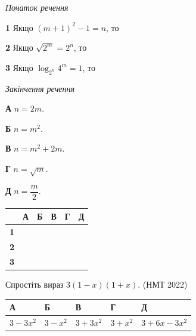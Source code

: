 \documentclass[14pt]{extarticle}
\newcommand{\answerTable}[5]{
\begin{center}
\begin{tabular}{|*{5}{>{\centering\arraybackslash}m{2.8cm}|}}
\hline
\rule[-0.3cm]{0pt}{0.8cm}\textbf{А} & \textbf{Б} & \textbf{В} & \textbf{Г} & \textbf{Д} \\
\hline
\rule[-0.4cm]{0pt}{1.0cm}#1 & \rule[-0.4cm]{0pt}{1.0cm}#2 & \rule[-0.4cm]{0pt}{1.0cm}#3 & \rule[-0.4cm]{0pt}{1.0cm}#4 & \rule[-0.4cm]{0pt}{1.0cm}#5 \\
\hline
\end{tabular}
\end{center}
}
\newcommand{\matchTable}{
\begin{tabular}{|>{\centering\arraybackslash}p{0.25cm}|*{5}{>{\centering\arraybackslash}p{0.25cm}|}}
\hline
& \scriptsize\textbf{А} & \scriptsize\textbf{Б} & \scriptsize\textbf{В} & \scriptsize\textbf{Г} & \scriptsize\textbf{Д} \\
\hline
\scriptsize\textbf{1} & \rule{0pt}{0.25cm} & & & & \\
\hline
\scriptsize\textbf{2} & \rule{0pt}{0.25cm} & & & & \\
\hline
\scriptsize\textbf{3} & \rule{0pt}{0.25cm} & & & & \\
\hline
\end{tabular}
}
\newcommand{\task}[2]{\noindent\makebox[1.5em][l]{\textbf{#1.}}\parbox[t]{\dimexpr\textwidth-1.5em}{#2}}
\newcommand{\nmtyear}[1]{\hfill{\small\color{yearcolor}(НМТ #1)}}
\begin{document}
\vspace{0.3cm}
\noindent
\begin{minipage}[t]{0.4\textwidth}
\vspace{0pt}
\textit{Початок речення}

\vspace{0.2cm}
\textbf{1} \quad Якщо $(m + 1)^2 - 1 = n$, то

\vspace{0.2cm}
\textbf{2} \quad Якщо $\sqrt{2^m} = 2^n$, то

\vspace{0.2cm}
\textbf{3} \quad Якщо $\log_{2^n} 4^m = 1$, то
\end{minipage}
\hfill
\begin{minipage}[t]{0.32\textwidth}
\vspace{0pt}
\textit{Закінчення речення}

\vspace{0.2cm}
\textbf{А} \quad $n = 2m$.

\vspace{0.2cm}
\textbf{Б} \quad $n = m^2$.

\vspace{0.2cm}
\textbf{В} \quad $n = m^2 + 2m$.

\vspace{0.2cm}
\textbf{Г} \quad $n = \sqrt{m}$.

\vspace{0.2cm}
\textbf{Д} \quad $n = \dfrac{m}{2}$.
\end{minipage}
\hfill
\begin{minipage}[t]{0.18\textwidth}
\vspace{0pt}
\matchTable
\end{minipage}



\task{203}{Спростіть вираз $3(1 - x)(1 + x)$. \nmtyear{2022}}
\answerTable{$3 - 3x^2$}{$3 - x^2$}{$3 + 3x^2$}{$3 + x^2$}{$3 + 6x - 3x^2$}

\vspace{0.5cm}
\end{document}
